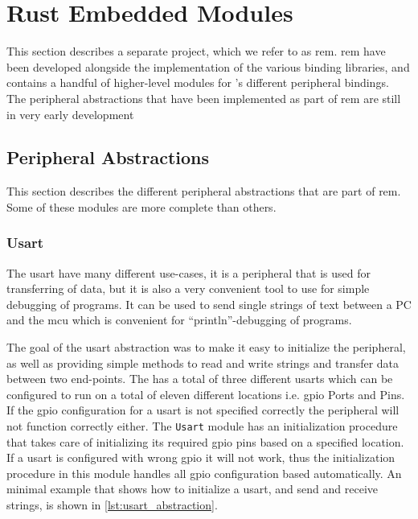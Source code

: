
\section{Rust Embedded Modules}
\label{sec:rust-embedded-modules}

This section describes a separate project, which we refer to as \gls{rem}.
\gls{rem} have been developed alongside the implementation of the various binding libraries, and contains a handful of higher-level modules for {\emlib}'s different peripheral bindings.
The peripheral abstractions that have been implemented as part of \gls{rem} are still in very early development

\subsection{Peripheral Abstractions}
\label{sub:peripheral_abstractions}


This section describes the different peripheral abstractions that are part of \gls{rem}.
Some of these modules are more complete than others.

\subsubsection{Usart}
\label{ssub:usart}

The \gls{usart} have many different use-cases, it is a peripheral that is used for transferring of data, but it is also a very convenient tool to use for simple debugging of programs.
It can be used to send single strings of text between a PC and the \gls{mcu} which is convenient for ``println''-debugging of programs.

The goal of the \gls{usart} abstraction was to make it easy to initialize the peripheral, as well as providing simple methods to read and write strings and transfer data between two end-points.
The {\gecko} has a total of three different \glspl{usart} which can be configured to run on a total of eleven different locations i.e. \gls{gpio} Ports and Pins.
If the \gls{gpio} configuration for a \gls{usart}  is not specified correctly the peripheral will not function correctly either.
The \texttt{Usart} module has an initialization procedure that takes care of initializing its required \gls{gpio} pins based on a specified location.
If a \gls{usart} is configured with wrong \gls{gpio} it will not work, thus the initialization procedure in this module handles all \gls{gpio} configuration based automatically.
An minimal example that shows how to initialize a \gls{usart}, and send and receive strings, is shown in \autoref{lst:usart_abstraction}.

